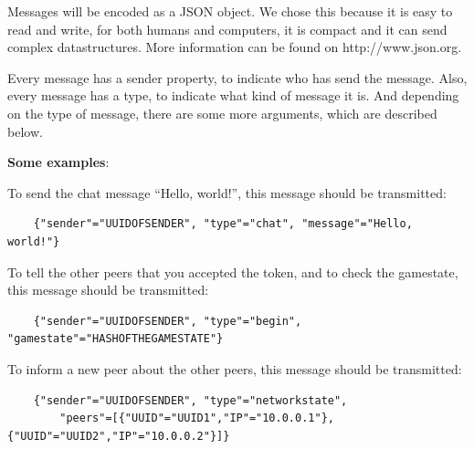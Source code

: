     Messages will be encoded as a JSON object. We chose this because it is easy to read and write, for both humans and computers, it is compact and it can send complex datastructures. More information can be found on http://www.json.org.

    Every message has a sender property, to indicate who has send the message. Also, every message has a type, to indicate what kind of message it is. And depending on the type of message, there are some more arguments, which are described below.

    \textbf{Some examples}:

    To send the chat message ``Hello, world!'', this message should be transmitted:
    \begin{verbatim}
    {"sender"="UUIDOFSENDER", "type"="chat", "message"="Hello, world!"}
    \end{verbatim}

    To tell the other peers that you accepted the token, and to check the gamestate, this message should be transmitted:
    \begin{verbatim}
    {"sender"="UUIDOFSENDER", "type"="begin", "gamestate"="HASHOFTHEGAMESTATE"}
    \end{verbatim}

    To inform a new peer about the other peers, this message should be transmitted:
    \begin{verbatim}
    {"sender"="UUIDOFSENDER", "type"="networkstate",
        "peers"=[{"UUID"="UUID1","IP"="10.0.0.1"}, {"UUID"="UUID2","IP"="10.0.0.2"}]}
    \end{verbatim}

